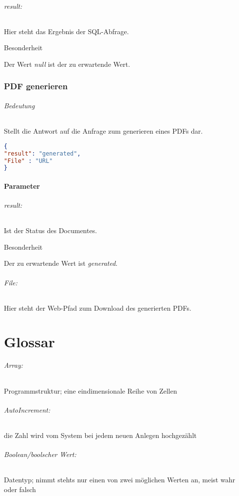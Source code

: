 \documentclass[12pt,parskip=full, pagea4]{scrreprt}
\begin{document}
			\paragraph{result:}Hier steht das Ergebnis der SQL-Abfrage.
			\subparagraph{Besonderheit} \leftskip=1.5cm Der Wert \textit{null} ist der zu erwartende Wert.
			
			\leftskip=0cm
			
			\section{PDF generieren}
			\paragraph{Bedeutung} Stellt die Antwort auf die Anfrage zum generieren eines PDFs dar.
			\begin{lstlisting}[language=JSON]
{
"result": "generated",
"File" : "URL"
}
			\end{lstlisting}
			\subsection{Parameter}
			\paragraph{result:}Ist der Status des Documentes.
			\subparagraph{Besonderheit} \leftskip=1.5cm Der zu erwartende Wert ist \textit{generated}. 
			\paragraph{File:} \leftskip=0cm Hier steht der Web-Pfad zum Download des generierten PDFs.   
    
    \part{Glossar}
    
    \paragraph{Array:} Programmstruktur; eine eindimensionale Reihe von Zellen
    \paragraph{AutoIncrement:} die Zahl wird vom System bei jedem neuen Anlegen hochgezählt
    \paragraph{Boolean/boolscher Wert:} Datentyp; nimmt stehts nur einen von zwei möglichen Werten an, meist wahr oder falsch
\end{document}
